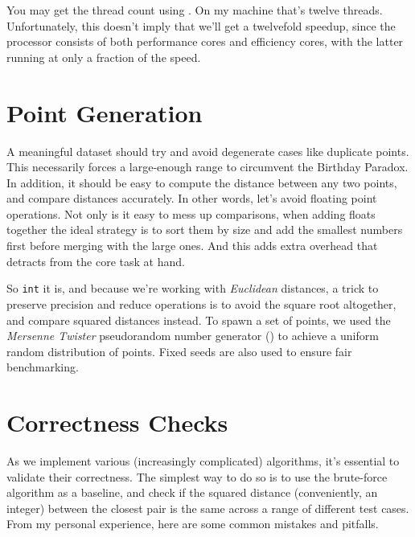 \begin{aside}
    You may get the thread count using . On my machine
    that's twelve threads. Unfortunately, this doesn't imply that we'll get a twelvefold speedup,
    since the processor consists of both performance cores and efficiency cores, with the latter running
    at only a fraction of the speed.
\end{aside}

\section{Point Generation}

A meaningful dataset should try and avoid degenerate cases like duplicate points. This
necessarily forces a large-enough range to circumvent the Birthday Paradox. In addition,
it should be easy to compute the distance between any two points, and compare distances
accurately. In other words, let's avoid floating point operations. Not only is it easy to mess up
comparisons, when adding floats together the ideal strategy is to sort them by size and add
the smallest numbers first before merging with the large ones. And this adds extra overhead
that detracts from the core task at hand.

So \texttt{int} it is, and because we're working with \textit{Euclidean} distances, a trick
to preserve precision and reduce operations is to avoid the square root altogether, and
compare squared distances instead. To spawn a set of points, we used the \textit{Mersenne Twister}
pseudorandom number generator () to achieve a uniform random distribution
of points. Fixed seeds are also used to ensure fair benchmarking.

\section{Correctness Checks}

As we implement various (increasingly complicated) algorithms, it's essential to validate
their correctness. The simplest way to do so is to use the brute-force algorithm as
a baseline, and check if the squared distance (conveniently, an integer) between the
closest pair is the same across a range of different test cases. From my personal
experience, here are some common mistakes and pitfalls.

